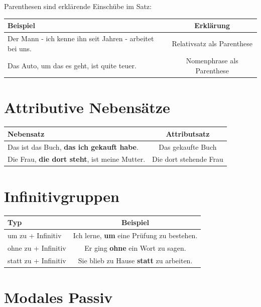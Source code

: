 Parenthesen sind erklärende Einschübe im Satz:

\begin{center}
\begin{tabular}{|l|c|}
\hline
Beispiel & Erklärung \\ \hline
Der Mann - ich kenne ihn seit Jahren - arbeitet bei uns. & Relativsatz als Parenthese \\ \hline
Das Auto, um das es geht, ist quite teuer. & Nomenphrase als Parenthese \\ \hline
\end{tabular}
\end{center}

\section{Attributive Nebensätze}
\label{sec:C1Attributiv}

\begin{center}
\begin{tabular}{|l|c|}
\hline
Nebensatz & Attributsatz \\ \hline
Das ist das Buch, \textbf{das ich gekauft habe}. & Das gekaufte Buch \\ \hline
Die Frau, \textbf{die dort steht}, ist meine Mutter. & Die dort stehende Frau \\ \hline
\end{tabular}
\end{center}

\section{Infinitivgruppen}
\label{sec:C1Infinitiv}

\begin{center}
\begin{tabular}{|l|c|}
\hline
Typ & Beispiel \\ \hline
um zu + Infinitiv & Ich lerne, \textbf{um} eine Prüfung zu bestehen. \\ \hline
ohne zu + Infinitiv & Er ging \textbf{ohne} ein Wort zu sagen. \\ \hline
statt zu + Infinitiv & Sie blieb zu Hause \textbf{statt} zu arbeiten. \\ \hline
\end{tabular}
\end{center}

\section{Modales Passiv}
\label{sec:C1ModalPassiv}

